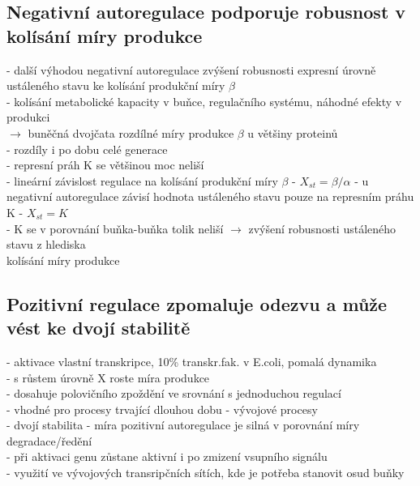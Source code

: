\documentclass[11pt,a4paper]{report}
\begin{document}
\subsection{Negativní autoregulace podporuje robusnost v kolísání míry produkce}
- další výhodou negativní autoregulace zvýšení robusnosti expresní úrovně ustáleného stavu ke kolísání produkční míry $\beta$\\
- kolísání metabolické kapacity v buňce, regulačního systému, náhodné efekty v produkci\\
\indent $\rightarrow$ buněčná dvojčata rozdílné míry produkce $\beta$ u většiny proteinů\\
\indent - rozdíly i po dobu celé generace\\
\indent - represní práh K se většinou moc neliší\\
- lineární závislost regulace na kolísání produkční míry $\beta$ - $X_{st}=\beta/\alpha$
- u negativní autoregulace závisí hodnota ustáleného stavu pouze na represním práhu K - $X_{st}=K$\\
\indent - K se v porovnání buňka-buňka tolik neliší $\rightarrow$ zvýšení robusnosti ustáleného stavu z hlediska\\
\indent kolísání míry produkce\\
 
\subsection{Pozitivní regulace zpomaluje odezvu a může vést ke dvojí stabilitě}
- aktivace vlastní transkripce, 10\% transkr.fak. v E.coli, pomalá dynamika\\
- s růstem úrovně X roste míra produkce\\
- dosahuje polovičního zpoždění ve srovnání s jednoduchou regulací\\
- vhodné pro procesy trvající dlouhou dobu - vývojové procesy\\
- dvojí stabilita - míra pozitivní autoregulace je silná v porovnání míry degradace/ředění\\
- při aktivaci genu zůstane aktivní i po zmizení vsupního signálu\\
- využití ve vývojových transripčních sítích, kde je potřeba stanovit osud buňky\\
\end{document}
